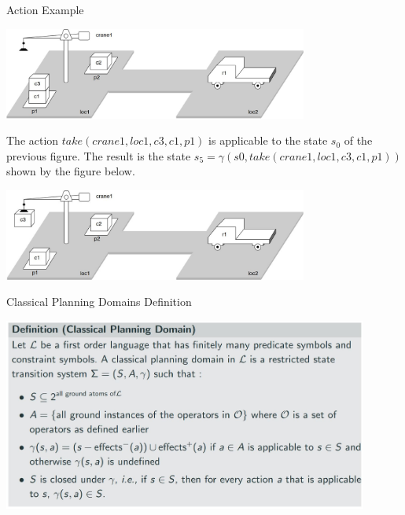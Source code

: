 \documentclass[9pt]{beamer}
\begin{document}
\begin{frame}{Action Example}
\begin{small}

\begin{center}
\includegraphics[keepaspectratio, width=0.75\textwidth]{images/automated_planning_example2.jpg}
\end{center}

The action $take(crane1,loc1,c3,c1,p1)$ is applicable to the state $s_0$ of the previous figure. The result is the state $s_5 = \gamma (s0,take(crane1,loc1,c3,c1,p1))$ shown by the figure below.

\begin{center}
\includegraphics[keepaspectratio, width=0.75\textwidth]{images/automated_planning_example3.jpg}
\end{center}

\end{small}
\end{frame}

\begin{frame}{Classical Planning Domains Definition}
\begin{small}

\begin{center}
\includegraphics[keepaspectratio, width=0.90\textwidth]{images/automated_planning_classical_def.jpg}
\end{center}

\end{small}
\end{frame}
\end{document}
